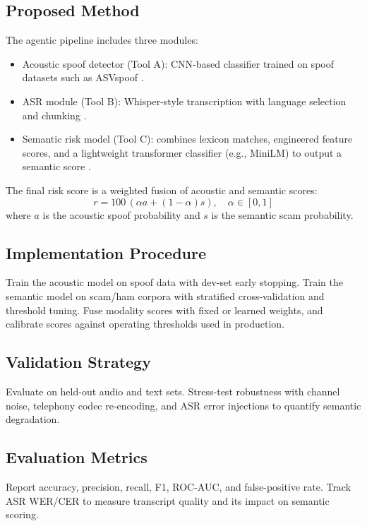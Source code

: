 \documentclass[11pt,a4paper]{article}
\begin{document}
\subsection{Proposed Method}
The agentic pipeline includes three modules:
\begin{itemize}[noitemsep]
\item Acoustic spoof detector (Tool A): CNN-based classifier trained on spoof datasets such as ASVspoof \cite{asvspoof2019}.
\item ASR module (Tool B): Whisper-style transcription with language selection and chunking \cite{whisper2022}.
\item Semantic risk model (Tool C): combines lexicon matches, engineered feature scores, and a lightweight transformer classifier (e.g., MiniLM) to output a semantic score \cite{minilm2020}.
\end{itemize}
The final risk score is a weighted fusion of acoustic and semantic scores:
\begin{equation}
r = 100\, (\alpha a + (1-\alpha) s), \quad \alpha \in [0,1]
\end{equation}
where $a$ is the acoustic spoof probability and $s$ is the semantic scam probability.

\subsection{Implementation Procedure}
Train the acoustic model on spoof data with dev-set early stopping. Train the semantic model on scam/ham corpora with stratified cross-validation and threshold tuning. Fuse modality scores with fixed or learned weights, and calibrate scores against operating thresholds used in production.

\subsection{Validation Strategy}
Evaluate on held-out audio and text sets. Stress-test robustness with channel noise, telephony codec re-encoding, and ASR error injections to quantify semantic degradation.

\subsection{Evaluation Metrics}
Report accuracy, precision, recall, F1, ROC-AUC, and false-positive rate. Track ASR WER/CER to measure transcript quality and its impact on semantic scoring.
\end{document}
